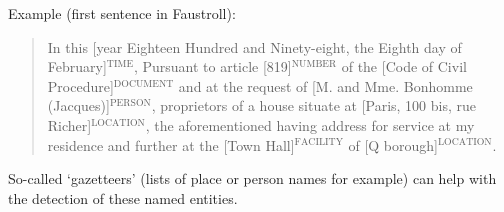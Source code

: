 Example (first sentence in Faustroll):

\begin{quote}
  In this [year Eighteen Hundred and Ninety-eight, the Eighth day of February]$^{\text{TIME}}$, Pursuant to article [819]$^{\text{NUMBER}}$ of the [Code of Civil Procedure]$^{\text{DOCUMENT}}$ and at the request of [M. and Mme. Bonhomme (Jacques)]$^{\text{PERSON}}$, proprietors of a house situate at [Paris, 100 bis, rue Richer]$^{\text{LOCATION}}$, the aforementioned having address for service at my residence and further at the [Town Hall]$^{\text{FACILITY}}$ of [Q borough]$^{\text{LOCATION}}$.
\end{quote}

So-called `gazetteers' (lists of place or person names for example) can help with the detection of these named entities.


\stopcontents[chapters]
